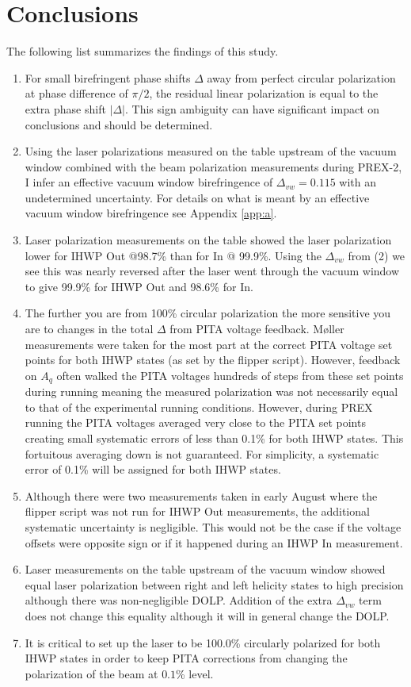 \documentclass[12pt]{article}
\begin{document}
\section{Conclusions}
The following list summarizes the findings of this study.
\begin{enumerate}
\item{For small birefringent phase shifts $\Delta$ away from perfect circular polarization at phase difference of $\pi/2$, the residual linear polarization is equal to the extra phase shift $\left|\Delta\right|$. This sign ambiguity can have significant impact on conclusions and should  be determined. }
\item{Using the laser polarizations measured on the table upstream of the vacuum window combined with the beam polarization measurements during PREX-2, I infer an effective vacuum window birefringence of $\Delta_{vw}=0.115$ with an undetermined uncertainty. For details on what is meant by an effective vacuum window birefringence see Appendix \ref{app:a}.}
\item{Laser polarization measurements on the table showed the laser polarization lower for IHWP Out @98.7\% than for In @ 99.9\%. Using the $\Delta_{vw}$ from (2) we see this was nearly reversed after the laser went through the vacuum window to give 99.9\% for IHWP Out and 98.6\% for In.}
\item{The further you are from 100\% circular polarization the more sensitive you are to changes in the total $\Delta$ from PITA voltage feedback. M\o ller measurements were taken for the most part at the correct PITA voltage set points for both IHWP states (as set by the flipper script). However, feedback on $A_q$ often walked the PITA voltages hundreds of steps from these set points during running meaning the measured polarization was not necessarily equal to that of the experimental running conditions. However, during PREX running the PITA voltages  averaged very close to the PITA set points creating small systematic errors of less than 0.1\% for both IHWP states. This fortuitous averaging down is not guaranteed. For simplicity, a systematic error of 0.1\% will be assigned for both IHWP states.}
\item{Although there were two measurements taken in early August where the flipper script was not run for IHWP Out measurements, the additional systematic uncertainty is negligible. This would not be the case if the voltage offsets were opposite sign or if it happened during an IHWP In measurement.}
\item{Laser measurements on the table upstream of the vacuum window showed equal laser polarization between right and left helicity states to high precision although there was non-negligible DOLP.  Addition of the extra $\Delta_{vw}$ term does not change this equality although it will in general change the DOLP.}
\item{It is critical to set up the laser to be 100.0\% circularly polarized for both IHWP states in order to keep PITA corrections from changing the polarization of the beam at $0.1$\% level.}
\end{enumerate}
\FloatBarrier
\appendix
\end{document}
